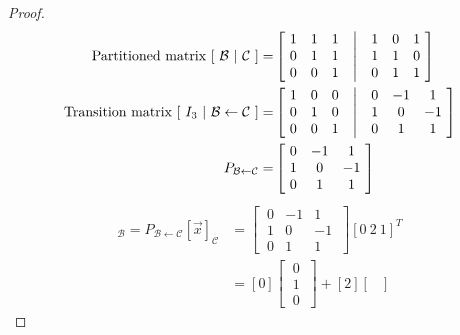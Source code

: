\documentclass[../main.tex]{subfiles}
\begin{document}
\begin{proof}
        \begin{align*}
                \textrm{Partitioned matrix } [\ \mathcal{B}\ |\ \mathcal{C}\ ] =
                 & \begin{bmatrix}
                        \ 1 & 1 & 1 & \bigm| & 1 & 0 & 1 \ \\
                        \ 0 & 1 & 1 & \bigm| & 1 & 1 & 0 \ \\
                        \ 0 & 0 & 1 & \bigm| & 0 & 1 & 1 \
                \end{bmatrix} \\
                \textrm{Transition matrix } [\ I_3 \ |\ {\mathcal{B} \leftarrow \mathcal{C}}\ ] =
                 & \begin{bmatrix}
                        \ 1 & 0 & 0 & \bigm| & 0 & -1 & 1 \  \\
                        \ 0 & 1 & 0 & \bigm| & 1 & 0  & -1 \ \\
                        \ 0 & 0 & 1 & \bigm| & 0 & 1  & 1 \
                \end{bmatrix} \\
                P_{\mathcal{B} \leftarrow \mathcal{C}} =
                 & \begin{bmatrix}
                        \ 0 & -1 & 1 \  \\
                        \ 1 & 0  & -1 \ \\
                        \ 0 & 1  & 1  \
                \end{bmatrix}
        \end{align*}
        \begin{align*}
                [\vec{x}]_\mathcal{B} = P_{\mathcal{B} \leftarrow \mathcal{C}}[\vec{x}]_{\mathcal{C}}
                 & = \begin{bmatrix}
                        \ 0 & -1 & 1 \  \\
                        \ 1 & 0  & -1 \ \\
                        \ 0 & 1  & 1  \
                \end{bmatrix}[0 \ 2 \ 1]^T \\
                 & = [0]\begin{bmatrix}
                        \ 0 \ \\
                        \ 1 \ \\
                        \ 0 \
                \end{bmatrix} +
                [2] \begin{bmatrix}

\end{bmatrix}
\end{align*}
\end{proof}
\end{document}
